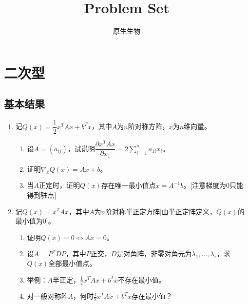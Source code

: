 \documentclass[a4paper,UTF8,fontset=windows]{ctexart}
\title{Problem Set}
\author{原生生物}
\date{}
\begin{document}
\maketitle

\section{二次型}
\subsection{基本结果}
\begin{enumerate}
    \item 记$Q(x)=\dfrac{1}{2}x^TAx+b^Tx$，其中$A$为$n$阶对称方阵，$x$为$n$维向量。
    \begin{enumerate}
        \item 设$A=(a_{ij})$，试说明$\dfrac{\partial x^TAx}{\partial x_1}=2\sum_{i=1}^na_{1i}x_i$。
        \item 证明$\nabla_x Q(x)=Ax+b$。
        \item 当$A$正定时，证明$Q(x)$存在唯一最小值点$x=A^{-1}b$。[注意梯度为0只能得到驻点]
    \end{enumerate}
    \item 记$Q(x)=x^TAx$，其中$A$为$n$阶对称半正定方阵[由半正定阵定义，$Q(x)$的最小值为0]。
    \begin{enumerate}
        \item 证明$Q(x)=0\Leftrightarrow Ax=0$。
        \item 设$A=P^TDP$，其中$P$正交，$D$是对角阵，非零对角元为$\lambda_1,\dots,\lambda_r$，求$Q(x)$全部最小值点。
        \item 举例：$A$半正定，$\frac{1}{2}x^TAx+b^Tx$不存在最小值。
        \item 对一般对称阵$A$，何时$\frac{1}{2}x^TAx+b^Tx$存在最小值？
    \end{enumerate}
\end{enumerate}
\end{document}
